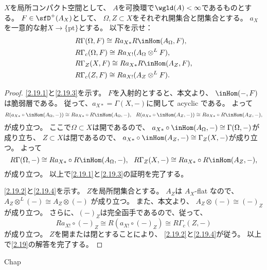 \documentclass[uplatex,dvipdfmx]{jsarticle}
\begin{document}
\maketitle
\HeaderCommentA
\section{}
\LocCptRemark
\fi


\begin{prob}\label{2.19}
  \(X\)を局所コンパクト空間として、
  \(A\)を可換環で\(\wgld(A)<\infty\)であるものとする。
  \(F\in \sfD^+(A_X)\)として、
  \(\Omega,Z\subset X\)をそれぞれ開集合と閉集合とする。
  \(a_X\)を一意的な射\(X\to \{\text{pt}\}\)とする。
  以下を示せ：
  \begin{align}
    &R\Gamma(\Omega,F) \cong Ra_{X*}R\inHom(A_{\Omega},F),
    \label{2.19.1} \\
    &R\Gamma_c(\Omega,F) \cong Ra_{X!}(A_{\Omega}\otimes^L F),
    \label{2.19.2} \\
    &R\Gamma_Z(X,F) \cong Ra_{X*}R\inHom(A_Z,F),
    \label{2.19.3} \\
    &R\Gamma_c(Z,F) \cong Ra_{X!}(A_Z\otimes^L F).
    \label{2.19.4}
  \end{align}
\end{prob}

\begin{proof}
  \eqref{2.19.1}と\eqref{2.19.3}を示す。
  \(F\)を入射的とすると、本文\cite[Proposition 2.4.6 (vii)]{kashiwara2002sheaves}より、
  \(\inHom(-,F)\)は脆弱層である。
  従って、\(a_{X*}=\Gamma(X,-)\)に関して acyclic である。
  よって
  \[
  R(a_{X*}\circ \inHom(A_{\Omega},-)) \cong Ra_{X*}\circ R\inHom(A_{\Omega},-), \ \
  R(a_{X*}\circ \inHom(A_Z,-)) \cong Ra_{X*}\circ R\inHom(A_Z,-),
  \]
  が成り立つ。
  ここで\(\Omega\subset X\)は開であるので、
  \(a_{X*}\circ \inHom(A_{\Omega},-)\cong \Gamma(\Omega,-)\)が成り立ち、
  \(Z\subset X\)は閉であるので、
  \(a_{X*}\circ \inHom(A_Z,-)\cong \Gamma_Z(X,-)\)が成り立つ。
  よって
  \[
  R\Gamma(\Omega,-) \cong Ra_{X*}\circ R\inHom(A_{\Omega},-), \ \
  R\Gamma_Z(X,-) \cong Ra_{X*}\circ R\inHom(A_Z,-),
  \]
  が成り立つ。
  以上で\eqref{2.19.1}と\eqref{2.19.3}の証明を完了する。

  \eqref{2.19.2}と\eqref{2.19.4}を示す。
  \(Z\)を局所閉集合とする。
  \(A_Z\)は \(A_X\)-flat なので、
  \(A_Z\otimes^L (-)\cong A_Z\otimes (-)\)
  が成り立つ。
  また、本文\cite[Proposition 2.3.10]{kashiwara2002sheaves}より、
  \(A_Z\otimes (-)\cong (-)_Z\)が成り立つ。
  さらに、\((-)_Z\)は完全函手であるので、従って、
  \[Ra_{X!}\circ (-)_Z \cong R(a_{X!}\circ (-)_Z) \cong R\Gamma_c(Z,-)\]
  が成り立つ。
  \(Z\)を開または閉とすることにより、
  \eqref{2.19.2}と\eqref{2.19.4}が従う。
  以上で\autoref{2.19}の解答を完了する。
\end{proof}




\ifcsname Chap\endcsname\else
\printbibliography
\end{document}
